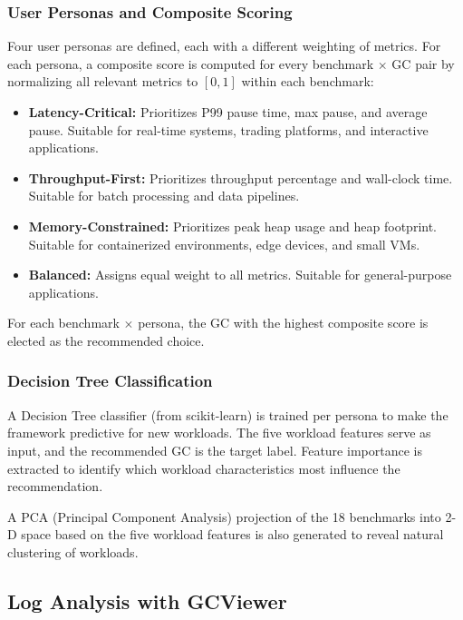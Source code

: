 \subsubsection{User Personas and Composite Scoring}

Four user personas are defined, each with a different weighting of metrics. For each persona, a composite score is computed for every benchmark $\times$ GC pair by normalizing all relevant metrics to $[0, 1]$ within each benchmark:

\begin{itemize}
\item \textbf{Latency-Critical:} Prioritizes P99 pause time, max pause, and average pause. Suitable for real-time systems, trading platforms, and interactive applications.
\item \textbf{Throughput-First:} Prioritizes throughput percentage and wall-clock time. Suitable for batch processing and data pipelines.
\item \textbf{Memory-Constrained:} Prioritizes peak heap usage and heap footprint. Suitable for containerized environments, edge devices, and small VMs.
\item \textbf{Balanced:} Assigns equal weight to all metrics. Suitable for general-purpose applications.
\end{itemize}

For each benchmark $\times$ persona, the GC with the highest composite score is elected as the recommended choice.

\subsubsection{Decision Tree Classification}

A Decision Tree classifier (from scikit-learn) is trained per persona to make the framework predictive for new workloads. The five workload features serve as input, and the recommended GC is the target label. Feature importance is extracted to identify which workload characteristics most influence the recommendation.

A PCA (Principal Component Analysis) projection of the 18 benchmarks into 2-D space based on the five workload features is also generated to reveal natural clustering of workloads.

\subsection{Log Analysis with GCViewer}


